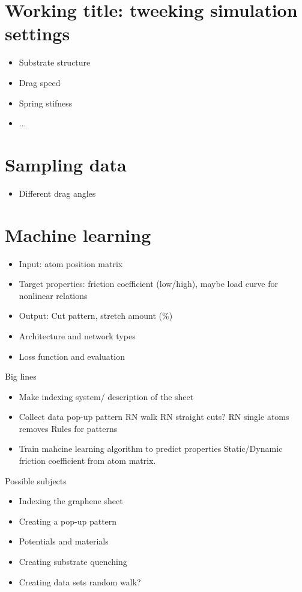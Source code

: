 \section*{Working title: tweeking simulation settings} %
\begin{itemize}
  \item Substrate structure
  \item Drag speed
  \item Spring stifness
  \item ...
\end{itemize}

\section*{Sampling data}
\begin{itemize}
  \item Different drag angles
\end{itemize}

\section*{Machine learning}
\begin{itemize}
  \item Input: atom position matrix
  \item Target properties: friction coefficient (low/high), maybe load curve for nonlinear relations
  \item Output: Cut pattern, stretch amount (\%)
  \item Architecture and network types
  \item Loss function and evaluation
\end{itemize}



\newpage
Big lines
\begin{itemize}
    \item Make indexing system/ description of the sheet 
    \item Collect data 
    \subitem pop-up pattern
    \subitem RN walk 
    \subitem RN straight cuts?
    \subitem RN single atoms removes
    \subitem Rules for patterns
    \item Train mahcine learning algorithm to predict properties
    \subitem Static/Dynamic friction coefficient from atom matrix. 
\end{itemize}    


Possible subjects
\begin{itemize}
    \item Indexing the graphene sheet
    \item Creating a pop-up pattern
    \item Potentials and materials
    \item Creating substrate
    \subitem quenching
    \item Creating data sets
    \subitem random walk?
\end{itemize}    


